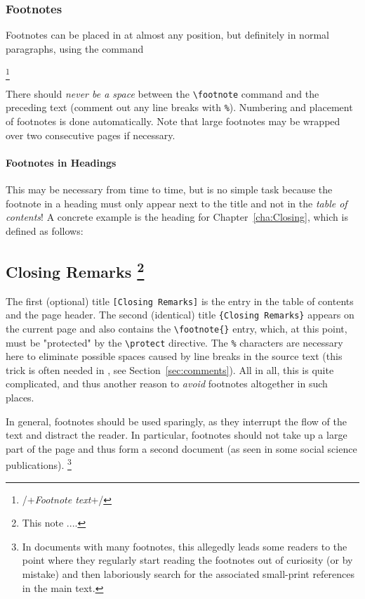 \subsection{Footnotes}

Footnotes can be placed in \latex at almost any position, but definitely in
normal paragraphs, using the command
%
\begin{LaTeXCode}[numbers=none]
\footnote{/+\emph{Footnote text}+/}
\end{LaTeXCode}
%
There should \emph{never be a space} between the \verb!\footnote! command and
the preceding text (comment out any line breaks with \verb!%!). Numbering
and placement of footnotes is done automatically. Note that large footnotes
may be wrapped over two consecutive pages if necessary.

\subsubsection{Footnotes in Headings}

This may be necessary from time to time, but is no simple task because the
footnote in a heading must only appear next to the title and not in the \emph{table
of contents}! A concrete example is the heading for Chapter~\ref{cha:Closing},
which is defined as follows:
%
\begin{LaTeXCode}[numbers=none]
\chapter[Closing Remarks]%
        {Closing Remarks%
        \protect\footnote{This note ....}}%
\end{LaTeXCode}
%
The first (optional) title \verb![Closing Remarks]! is the entry in the table of
contents and the page header. The second (identical) title \texttt{\{Closing
Remarks\}} appears on the current page and also contains the \verb!\footnote{}!
entry, which, at this point, must be "protected" by the \verb!\protect!
directive. The \verb!%! characters are necessary here to eliminate possible
spaces caused by line breaks in the source text (this trick is often needed in
\latex, see Section~\ref{sec:comments}). All in all, this is quite complicated,
and thus another reason to \emph{avoid} footnotes altogether in such places.

In general, footnotes should be used sparingly, as they interrupt the flow of
the text and distract the reader. In particular, footnotes should not take up a
large part of the page and thus form a second document (as seen in some social
science publications).%
\footnote{In documents with many footnotes, this allegedly leads some readers to
the point where they regularly start reading the footnotes out of curiosity (or
by mistake) and then laboriously search for the associated small-print
references in the main text.}

